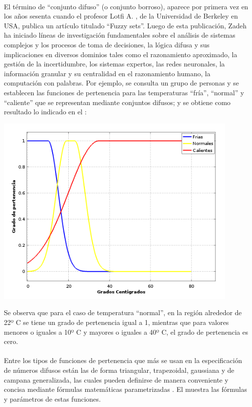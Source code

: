 \\
El término de “conjunto difuso” (o conjunto borroso), aparece por primera vez en los años sesenta cuando el profesor Lotfi A. \citet{zadeh1965fuzzy}, de la Universidad de Berkeley en USA, publica un artículo titulado ``Fuzzy sets''. Luego de esta publicación, Zadeh ha iniciado líneas de investigación fundamentales sobre el análisis de sistemas complejos y los procesos de toma de decisiones, la lógica difusa y sus implicaciones en diversos dominios tales como el razonamiento aproximado, la gestión de la incertidumbre, los sistemas expertos, las redes neuronales, la información granular y su centralidad en el razonamiento humano, la computación con palabras.
Por ejemplo, se consulta un grupo de personas y se establecen las funciones de pertenencia para las temperaturas ``fría'', ``normal'' y ``caliente'' que se representan mediante conjuntos difusos; y se obtiene como resultado lo indicado en el :

\begin{grafico}[titulo = Funciones de pertenencia para algunas temperaturas, etiqueta=graficoTemperaturas]
\includegraphics[width=12cm]{graficas/temparaturas.png}
\end{grafico}
Se observa que para el caso de temperatura ``normal'', en la región alrededor de 22º C se tiene un grado de pertenencia igual a 1, mientras que para valores menores o iguales a 10º C y mayores o iguales a 40º C, el grado de pertenencia es cero.\\
\\
Entre los tipos de funciones de pertenencia que más se usan en la especificación de números difusos están las de forma triangular, trapezoidal, gaussiana y de campana generalizada, las cuales pueden definirse de manera conveniente y concisa mediante fórmulas matemáticas parametrizadas \cite[]{jang1997neuro}. El  muestra las fórmulas y parámetros de estas funciones.\\

